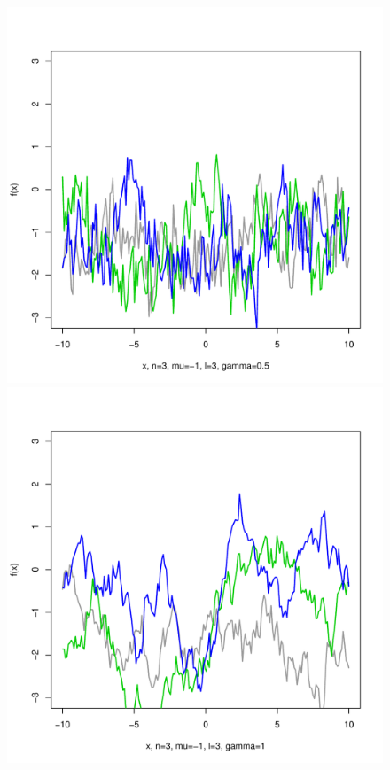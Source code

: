 \documentclass[12pt,letterpaper]{article}
\begin{document}
\begin{figure}
\begin{center}
\includegraphics[scale=0.2]{hw321/n3-m-1-l3-g1.pdf}
\includegraphics[scale=0.2]{hw321/n3-m-1-l3-g2.pdf}

\end{center}
\end{figure}
\end{document}
